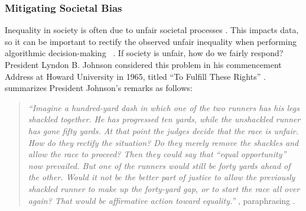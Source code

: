 \documentclass[11pt,dvipdfm]{article}
\begin{document}
\subsubsection{Mitigating Societal Bias}
\label{sec:societalBias}
Inequality in society is often due to unfair societal processes \cite{crenshaw1989demarginalizing, collins2002black}. This impacts data, so it can be important to rectify the observed unfair inequality when performing algorithmic decision-making ~\cite{barocas2016big}.  If society is unfair, how do we fairly respond?  President Lyndon B. Johnson considered this problem in his commencement Address at Howard University in 1965, titled ``To Fulfill These Rights'' \cite{johnson1965remarks}.  %
\cite{dionne2004americans} summarizes President Johnson's remarks as follows:
\begin{quote}
\emph{``Imagine a hundred-yard dash in which one of the two runners has his legs shackled together. He has progressed ten yards, while the unshackled runner has gone fifty yards.
At that point the judges decide that the race is unfair. How do they rectify the situation? Do they merely remove the shackles and allow the race to proceed? Then they could say that “equal opportunity” now prevailed. But one of the runners would still be forty yards ahead of the other. 
Would it not be the better part of justice to allow the previously shackled runner to make up the forty-yard gap, or to start the race all over again? That would be affirmative action toward equality.''} \cite{dionne2004americans}, paraphrasing \cite{johnson1965remarks}.
\end{quote}

\end{document}
